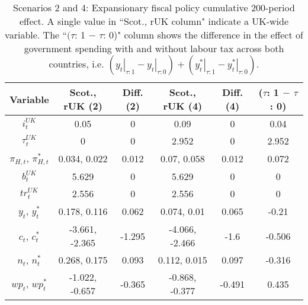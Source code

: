 \begin{table}[H]
\centering
\begin{tabular}{c|cc|cc|c}
  \hline
{\textbf{Variable}} & {\textbf{Scot., rUK (2)}} & {\textbf{Diff. (2)}} & {\textbf{Scot., rUK (4)}} & {\textbf{Diff. (4)}} & {\textbf{($\tau$: 1 $-$ $\tau$: 0)}} \\ 
  \hline
${i^{UK}_t}$ & 0.05 & 0 & 0.09 & 0 & 0.04 \\ 
  ${\tau^{UK}_t}$ & 0 & 0 & 2.952 & 0 & 2.952 \\ 
  ${\pi_{H,t}}$, ${\pi^*_{H,t}}$ & 0.034, 0.022 & 0.012 & 0.07, 0.058 & 0.012 & 0.072 \\ 
  ${b^{UK}_t}$ & 5.629 & 0 & 5.629 & 0 & 0 \\ 
  ${tr^{UK}_t}$ & 2.556 & 0 & 2.556 & 0 & 0 \\ 
  ${y_t}$, ${y^*_t}$ & 0.178, 0.116 & 0.062 & 0.074, 0.01 & 0.065 & -0.21 \\ 
  ${c_t}$, ${c^*_t}$ & -3.661, -2.365 & -1.295 & -4.066, -2.466 & -1.6 & -0.506 \\ 
  ${n_t}$, ${n^*_t}$ & 0.268, 0.175 & 0.093 & 0.112, 0.015 & 0.097 & -0.316 \\ 
  ${wp_t}$, ${wp^*_t}$ & -1.022, -0.657 & -0.365 & -0.868, -0.377 & -0.491 & 0.435 \\ 
\end{tabular}
\vspace{0.5cm}
\caption{Scenarios 2 and 4: Expansionary fiscal policy cumulative 200-period effect. A single value in ``Scot., rUK column" indicate a UK-wide variable. The ``$(\tau$: 1 $-$ $\tau$: 0)" column shows the difference in the effect of government spending with and without labour tax across both countries, i.e. $(\left. y_t \right|_{\tau:1} - \left. y_t \right|_{\tau:0}) + (\left. y^*_t \right|_{\tau:1} - \left. y^*_t \right|_{\tau:0})$.} 
\label{table:responses_two_four}
\end{table}
